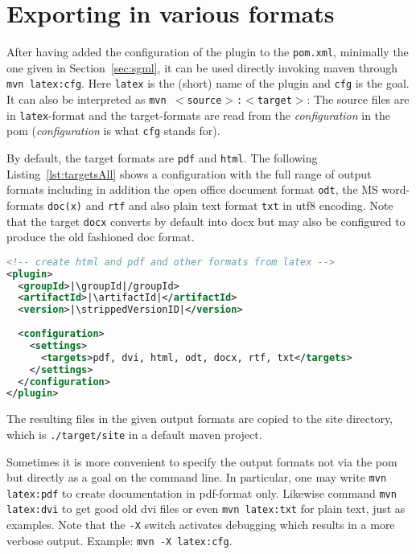 \section{Exporting in various formats}\label{sec:stableUsage}


After having added the configuration of the plugin to the \texttt{pom.xml},
minimally the one given in Section~\ref{sec:sgml},
it can be used directly invoking maven through 
\texttt{mvn latex:cfg}. 
Here \texttt{latex} is the (short) name of the plugin 
and \texttt{cfg} is the goal. 
It can also be interpreted as \texttt{mvn $<$source$>$:$<$target$>$}: 
The source files are in \texttt{latex}-format and the target-formats 
are read from the \emph{configuration} in the pom 
(\emph{configuration} is what \texttt{cfg} stands for). 

By default, the target formats are \texttt{pdf} and \texttt{html}. 
The following Listing~\ref{lst:targetsAll} shows a configuration 
with the full range of output formats including in addition 
the open office document format \texttt{odt}, 
the MS word-formats \texttt{doc(x)} and \texttt{rtf} %
and also plain text format \texttt{txt} in utf8 encoding. 
Note that the target \texttt{docx} converts by default into \gls{docx} 
but may also be configured to produce the old fashioned \gls{doc} format. 
%
\begin{lstlisting}[language=xml, basicstyle=\small,
escapechar=|,
float, captionpos=b, label={lst:targetsAll}, 
caption={Configuration with full range output formats}]
<!-- create html and pdf and other formats from latex -->
<plugin>
  <groupId>|\groupId|/groupId>
  <artifactId>|\artifactId|</artifactId>
  <version>|\strippedVersionID|</version>
	
  <configuration>
    <settings>
      <targets>pdf, dvi, html, odt, docx, rtf, txt</targets>
    </settings>
  </configuration>
</plugin>
\end{lstlisting}

The resulting files in the given output formats 
are copied to the site directory, 
which is \texttt{./target/site} in a default maven project. 

Sometimes it is more convenient 
to specify the output formats not via the pom 
but directly as a goal on the command line. 
In particular, one may write \texttt{mvn latex:pdf} to create documentation 
in pdf-format only.
Likewise command \texttt{mvn latex:dvi} to get good old dvi files
or even \texttt{mvn latex:txt} for plain text, just as examples. 
Note that the \texttt{-X} switch activates debugging 
which results in a more verbose output. 
Example: \texttt{mvn -X latex:cfg}. 

